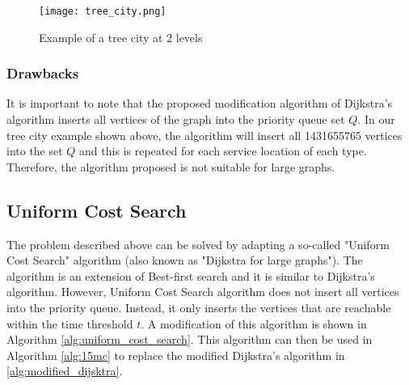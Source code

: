 \begin{figure}[h]
    \caption{Example of a tree city at 2 levels}
    \centering
    \texttt{[image: tree\_city.png]}
    \label{fig:tree_city}
\end{figure}

\subsubsection{Drawbacks}

It is important to note that the proposed modification algorithm of Dijkstra's algorithm inserts all vertices of the graph into the priority queue set $Q$. In our tree city example shown above, the algorithm will insert all 1431655765 vertices into the set $Q$ and this is repeated for each service location of each type. Therefore, the algorithm proposed is not suitable for large graphs.

\subsection{Uniform Cost Search}

The problem described above can be solved by adapting a so-called "Uniform Cost Search" algorithm (also known as "Dijkstra for large graphs"). The algorithm is an extension of Best-first search and it is similar to Dijkstra's algorithm. However, Uniform Cost Search algorithm does not insert all vertices into the priority queue. Instead, it only inserts the vertices that are reachable within the time threshold $t$. A modification of this algorithm is shown in Algorithm \ref{alg:uniform_cost_search}. This algorithm can then be used in Algorithm \ref{alg:15mc} to replace the modified Dijkstra's algorithm in \ref{alg:modified_dijsktra}.

